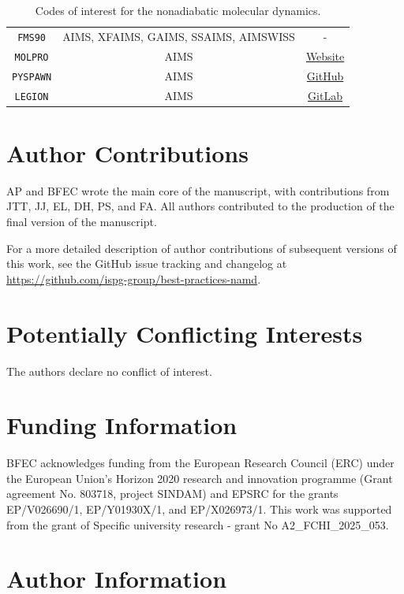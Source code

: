 \documentclass[9pt,bestpractices,pubversion]{livecoms}
\newcommand{\githubrepository}{\url{https://github.com/ispg-group/best-practices-namd}}  %
\begin{document}
\begin{table}[h!]
\begin{tabular}{|c|c|c|}
        \texttt{FMS90} & AIMS, XFAIMS, GAIMS, SSAIMS, AIMSWISS  & - \\ 
        \texttt{MOLPRO} & AIMS & \href{https://www.molpro.net}{Website} \\
        \texttt{PYSPAWN} & AIMS  & \href{https://github.com/blevine37/pySpawn17}{GitHub} \\ 
        \texttt{LEGION} & AIMS  & \href{https://gitlab.com/light-and-molecules/legion}{GitLab} \\  
    \hline
    \end{tabular}
    \caption{Codes of interest for the nonadiabatic molecular dynamics.}
    \label{tab:NAMD}
\end{table}

\clearpage

\section*{Author Contributions}


AP and BFEC wrote the main core of the manuscript, with contributions from JTT, JJ, EL, DH, PS, and FA. All authors contributed to the production of the final version of the manuscript.

For a more detailed description of author contributions of subsequent versions of this work, see the GitHub issue tracking and changelog at \githubrepository.


\section*{Potentially Conflicting Interests}

The authors declare no conflict of interest. 

\section*{Funding Information}

BFEC acknowledges funding from the European Research Council (ERC) under the European Union's Horizon 2020 research and innovation programme (Grant agreement No. 803718, project SINDAM) and EPSRC for the grants EP/V026690/1, EP/Y01930X/1, and EP/X026973/1.
This work was supported from the grant of Specific university research - grant No A2\_FCHI\_2025\_053.
\section*{Author Information}
\makeorcid

\end{document}
